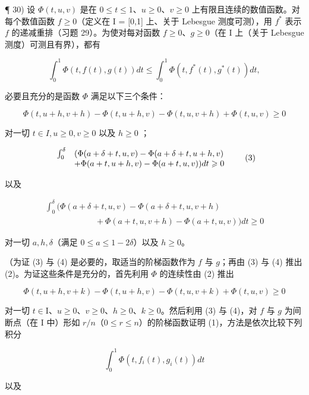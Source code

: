 ¶ 30) 设 \(\Phi(t, u, v)\) 是在 \(0 \leqslant t \leqslant 1\)、\(u \geqslant 0\)、\(v \geqslant 0\) 上有限且连续的数值函数。对每个数值函数 \(f \geqslant 0\)（定义在 I = {[}0,1{]} 上、关于 Lebesgue 测度可测），用 \(f^*\) 表示 \(f\) 的递减重排（习题 29）。为使对每对函数 \(f \geqslant 0\)、\(g \geqslant 0\)（在 I 上（关于 Lebesgue 测度）可测且有界），都有

\[
\int_ {0} ^ {1} \Phi (t, f (t), g (t)) d t \leqslant \int_ {0} ^ {1} \Phi (t, f ^ {*} (t), g ^ {*} (t)) d t,\tag{1}
\]

必要且充分的是函数 \(\Phi\) 满足以下三个条件：

\[
\Phi (t, u + h, v + h) - \Phi (t, u + h, v) - \Phi (t, u, v + h) + \Phi (t, u, v) \geqslant 0\tag{2}
\]

对一切 \(t \in I, u \geqslant 0, v \geqslant 0\) 以及 \(h \geqslant 0\) ；

\[
\begin{array}{r l} \int_ {0} ^ {\delta} & (\Phi (a + \delta + t, u, v) - \Phi (a + \delta + t, u + h, v) \\ & + \Phi (a + t, u + h, v) - \Phi (a + t, u, v)) d t \geqslant 0 \end{array}\tag{3}
\]

以及

\[
\begin{array}{l} \int_ {0} ^ {\delta} \big (\Phi (a + \delta + t, u, v) - \Phi (a + \delta + t, u, v + h) \\ \qquad \qquad \qquad + \Phi (a + t, u, v + h) - \Phi (a + t, u, v) \big) d t \geqslant 0 \end{array}\tag{4}
\]

对一切 \(a, h, \delta\)（满足 \(0 \leqslant a \leqslant 1 - 2\delta\)）以及 \(h \geqslant 0\)。

（为证 (3) 与 (4) 是必要的，取适当的阶梯函数作为 \(f\) 与 \(g\)；再由 (3) 与 (4) 推出 (2)。为证这些条件是充分的，首先利用 \(\Phi\) 的连续性由 (2) 推出

\[
\Phi (t, u + h, v + k) - \Phi (t, u + h, v) - \Phi (t, u, v + k) + \Phi (t, u, v) \geqslant 0\tag{5}
\]

对一切 \(t \in \mathrm{I}\)、\(u \geqslant 0\)、\(v \geqslant 0\)、\(h \geqslant 0\)、\(k \geqslant 0\)。然后利用 (3) 与 (4)，对 \(f\) 与 \(g\) 为间断点（在 \(\mathrm{I}\) 中）形如 \(r / n\)（\(0 \leqslant r \leqslant n\)）的阶梯函数证明 (1)，方法是依次比较下列积分

\[
\int_ {0} ^ {1} \Phi (t, f _ {i} (t), g _ {i} (t)) d t
\]

以及

